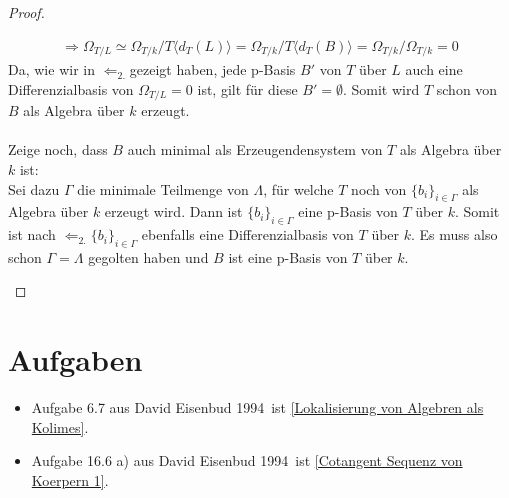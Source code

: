 \documentclass[10pt,a4paper]{report}
\newcommand{\comment}[1]{}
\newcommand{\ModulsOfDifferenzials}{David Eisenbud 1994}
\newcommand{\divR}[2]{\Omega_{#1/#2}}
\newcommand{\divf}[1]{d_{#1}}
\newcommand{\Verz}[1]{\langle #1 \rangle}
\begin{document}
\begin{proof}
\begin{itemize}
\begin{gather*}
\Rightarrow \divR{T}{L} \simeq \divR{T}{k}/T\Verz{\divf{T}(L)} = \divR{T}{k}/T\Verz{\divf{T}(B)}=
\divR{T}{k}/\divR{T}{k} = 0
\end{gather*}
Da, wie wir in \glqq$\Leftarrow_{2.}$\grqq gezeigt haben, jede p-Basis $B'$ von $T$ über $L$ auch eine Differenzialbasis von $\divR{T}{L} = 0$ ist, gilt für diese $B' = \emptyset$. Somit wird $T$ schon von $B$ als Algebra über $k$ erzeugt.\\
\ \\
Zeige noch, dass $B$ auch minimal als Erzeugendensystem von $T$ als Algebra über $k$ ist:\\
Sei dazu $\Gamma$ die minimale Teilmenge von $\Lambda$, für welche $T$ noch von $\lbrace b_i \rbrace_{i \in \Gamma}$ als Algebra über $k$ erzeugt wird. Dann ist $\lbrace b_i \rbrace_{i \in \Gamma}$ eine p-Basis von $T$ über $k$. Somit ist nach \glqq$\Leftarrow_{2.}$\grqq $\lbrace b_i \rbrace_{i \in \Gamma}$ ebenfalls eine Differenzialbasis von $T$ über $k$. Es muss also schon $\Gamma = \Lambda$ gegolten haben und $B$ ist eine p-Basis von $T$ über $k$. \comment{\label{*p-Basis ist minnimaler Erzeuger von T als Algebra}}
\end{itemize}
\end{proof}


\chapter{Aufgaben}
\begin{itemize}
\item Aufgabe 6.7 aus \ModulsOfDifferenzials \, ist \cref{Lokalisierung von Algebren als Kolimes}.
\item Aufgabe 16.6 a) aus \ModulsOfDifferenzials \, ist \cref{Cotangent Sequenz von Koerpern 1}.
\end{itemize}
\end{document}
